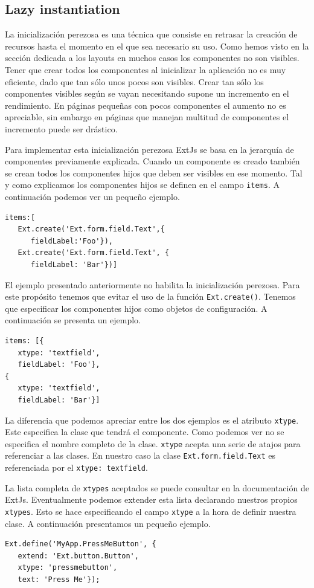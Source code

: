 	\subsection{Lazy instantiation}
		La inicialización perezosa es una técnica que consiste en retrasar la creación de recursos hasta el momento en el que sea necesario su
		uso. Como hemos visto en la sección dedicada a los layouts en muchos casos los componentes no son visibles. Tener que crear todos los
		componentes al inicializar la aplicación no es muy eficiente, dado que tan sólo unos pocos son visibles. Crear tan sólo los
		componentes visibles según se vayan necesitando supone un incremento en el rendimiento. En páginas pequeñas con pocos componentes el
		aumento no es apreciable, sin embargo en páginas que manejan multitud de componentes el incremento puede ser drástico. 
		\par
		Para implementar esta inicialización perezosa ExtJs se basa en la jerarquía de componentes previamente explicada. Cuando un componente
		es creado también se crean todos los componentes hijos que deben ser visibles en ese momento. Tal y como explicamos los componentes
		hijos se definen en el campo \texttt{items}. A continuación podemos ver un pequeño ejemplo. 
		\begin{lstlisting}[style=myJs]
items:[
   Ext.create('Ext.form.field.Text',{
      fieldLabel:'Foo'}),
   Ext.create('Ext.form.field.Text', {
      fieldLabel: 'Bar'})]
		\end{lstlisting}
		\par
		El ejemplo presentado anteriormente no habilita la inicialización perezosa. Para este propósito tenemos que evitar el uso de la
		función \texttt{Ext.create()}. Tenemos que especificar los componentes hijos como objetos de configuración. A continuación se presenta
		un ejemplo.
		\begin{lstlisting}[style=myJs]
items: [{
   xtype: 'textfield',
   fieldLabel: 'Foo'},
{
   xtype: 'textfield',
   fieldLabel: 'Bar'}]
		\end{lstlisting}
		\par
		La diferencia que podemos apreciar entre los dos ejemplos es el atributo \texttt{xtype}. Este especifica la clase que tendrá el
		componente.  Como podemos ver no se especifica el nombre completo de la clase. \texttt{xtype} acepta una serie de atajos para
		referenciar a las clases. En nuestro caso la clase \texttt{Ext.form.field.Text} es referenciada por el \texttt{xtype:\cc
		textfield\cc}.
		\par
		La lista completa de \texttt{xtypes} aceptados se puede consultar en la documentación de ExtJs\cite{ExtJsDoc}. Eventualmente podemos
		extender esta lista declarando nuestros propios \texttt{xtypes}. Esto se hace especificando el campo \texttt{xtype} a la hora de
		definir nuestra clase. A continuación presentamos un pequeño ejemplo.
		\begin{lstlisting}[style=myJs]
Ext.define('MyApp.PressMeButton', {
   extend: 'Ext.button.Button',
   xtype: 'pressmebutton',
   text: 'Press Me'});
		\end{lstlisting}

